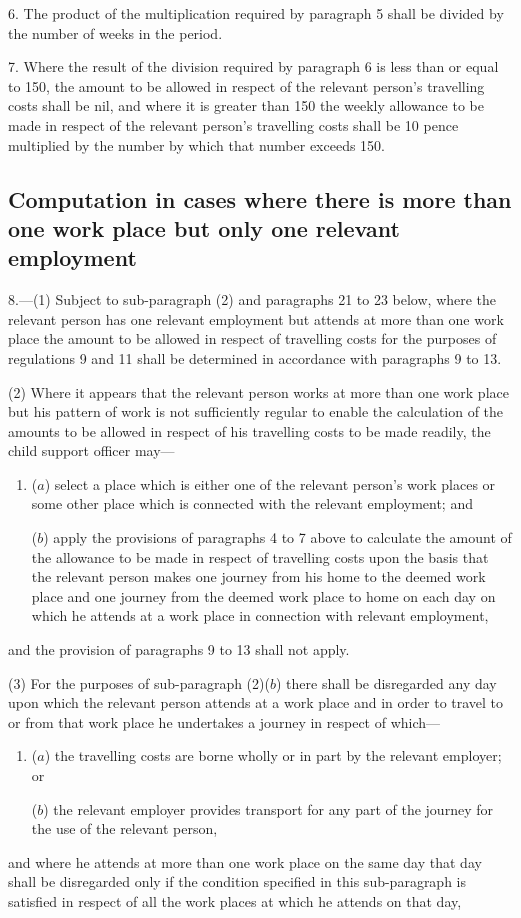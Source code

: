 \documentclass[12pt,a4paper]{article}
\begin{document}
\medskip


6.  The product of the multiplication required by paragraph 5 shall be divided by the number of weeks in the period.

\medskip

7.  Where the result of the division required by paragraph 6 is less than or equal to 150, the amount to be allowed in respect of the relevant person’s travelling costs shall be nil, and where it is greater than 150 the weekly allowance to be made in respect of the relevant person’s travelling costs shall be 10 pence multiplied by the number by which that number exceeds 150.

\subsection*{Computation in cases where there is more than one work place but only one relevant employment}

8.—(1) Subject to sub-paragraph (2) and paragraphs 21 to 23 below, where the relevant person has one relevant employment but attends at more than one work place the amount to be allowed in respect of travelling costs for the purposes of regulations 9 and 11 shall be determined in accordance with paragraphs 9 to 13.

(2) Where it appears that the relevant person works at more than one work place but his pattern of work is not sufficiently regular to enable the calculation of the amounts to be allowed in respect of his travelling costs to be made readily, the child support officer may—
\begin{enumerate}\item[]
($a$) select a place which is either one of the relevant person’s work places or some other place which is connected with the relevant employment; and

($b$) apply the provisions of paragraphs 4 to 7 above to calculate the amount of the allowance to be made in respect of travelling costs upon the basis that the relevant person makes one journey from his home to the deemed work place and one journey from the deemed work place to home on each day on which he attends at a work place in connection with relevant employment,
\end{enumerate}
and the provision of paragraphs 9 to 13 shall not apply.

(3) For the purposes of sub-paragraph (2)($b$) there shall be disregarded any day upon which the relevant person attends at a work place and in order to travel to or from that work place he undertakes a journey in respect of which—
\begin{enumerate}\item[]
($a$) the travelling costs are borne wholly or in part by the relevant employer; or

($b$) the relevant employer provides transport for any part of the journey for the use of the relevant person,
\end{enumerate}
and where he attends at more than one work place on the same day that day shall be disregarded only if the condition specified in this sub-paragraph is satisfied in respect of all the work places at which he attends on that day,
\end{document}
